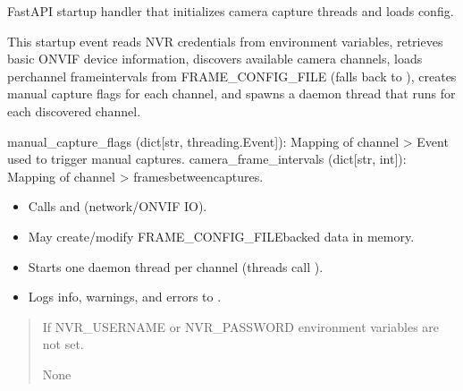 \documentclass[letterpaper,10pt,english]{sphinxmanual}
\begin{document}
\begin{fulllineitems}
\label{\detokenize{modules/src.data_intake.data_intake.NVRConnection:src.data_intake.data_intake.NVRConnection.startup_event}}
\pysigstartsignatures
\pysiglinewithargsret
{}
{}
{}
\pysigstopsignatures
\sphinxAtStartPar
FastAPI startup handler that initializes camera capture threads and loads config.

\sphinxAtStartPar
This startup event reads NVR credentials from environment variables, retrieves
basic ONVIF device information, discovers available camera channels, loads
per\sphinxhyphen{}channel frame\sphinxhyphen{}intervals from FRAME\_CONFIG\_FILE (falls back to ),
creates manual capture  flags for each channel, and spawns a
daemon thread that runs  for each discovered channel.
\begin{description}
\sphinxAtStartPar
manual\_capture\_flags (dict{[}str, threading.Event{]}): Mapping of channel \sphinxhyphen{}\textgreater{} Event used to trigger manual captures.
camera\_frame\_intervals (dict{[}str, int{]}): Mapping of channel \sphinxhyphen{}\textgreater{} frames\sphinxhyphen{}between\sphinxhyphen{}captures.

\begin{itemize}
\item {} 
\sphinxAtStartPar
Calls  and  (network/ONVIF IO).

\item {} 
\sphinxAtStartPar
May create/modify FRAME\_CONFIG\_FILE\sphinxhyphen{}backed data in memory.

\item {} 
\sphinxAtStartPar
Starts one daemon thread per channel (threads call ).

\item {} 
\sphinxAtStartPar
Logs info, warnings, and errors to .

\end{itemize}

\end{description}
\begin{quote}\begin{description}
\sphinxAtStartPar
{} \textendash{} If NVR\_USERNAME or NVR\_PASSWORD environment variables are not set.

\sphinxAtStartPar
None

\end{description}\end{quote}

\end{fulllineitems}
\end{document}
